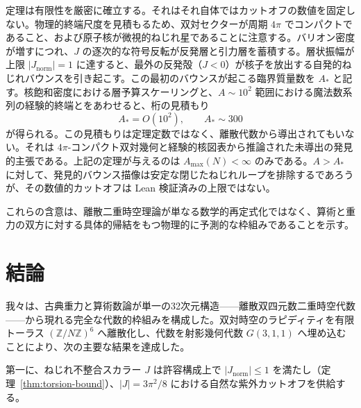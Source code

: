 \documentclass[a4paper]{article}
\theoremstyle{definition}
\theoremstyle{remark}
\newcommand{\Jnorm}{J_{\mathrm{norm}}}
\begin{document}
定理は有限性を厳密に確立する。それはそれ自体ではカットオフの数値を固定しない。物理的終端尺度を見積もるため、双対セクターが周期 \(4\pi\) でコンパクトであること、および原子核が微視的ねじれ星であることに注意する。バリオン密度が増すにつれ、\(J\) の逐次的な符号反転が反発層と引力層を蓄積する。層状振幅が上限 \(|\Jnorm| = 1\) に達すると、最外の反発殻（\(J < 0\)）が核子を放出する自発的ねじれバウンスを引き起こす。この最初のバウンスが起こる臨界質量数を \(A_*\) と記す。核飽和密度における層予算スケーリングと、\(A \sim 10^2\) 範囲における魔法数系列の経験的終端とをあわせると、桁の見積もり
\[
A_* = O(10^2), \qquad A_* \sim 300
\]
が得られる。この見積もりは定理定数ではなく、離散代数から導出されてもいない。それは \(4\pi\)-コンパクト双対幾何と経験的核図表から推論された未導出の発見的主張である。上記の定理が与えるのは \(A_{\max}(N)<\infty\) のみである。\(A > A_*\) に対して、発見的バウンス描像は安定な閉じたねじれループを排除するであろうが、その数値的カットオフは Lean 検証済みの上限ではない。

これらの含意は、離散二重時空理論が単なる数学的再定式化ではなく、算術と重力の双方に対する具体的帰結をもつ物理的に予測的な枠組みであることを示す。

\section{結論}

我々は、古典重力と算術数論が単一の32次元構造——離散双四元数二重時空代数——から現れる完全な代数的枠組みを構成した。双対時空のラピディティを有限トーラス \( (\mathbb{Z}/N\mathbb{Z})^6 \) へ離散化し、代数を射影幾何代数 \( G(3,1,1) \) へ埋め込むことにより、次の主要な結果を達成した。

第一に、ねじれ不整合スカラー \( J \) は許容構成上で \(|\Jnorm| \leq 1\) を満たし（定理~\ref{thm:torsion-bound}）、\(|J| = 3\pi^2/8\) における自然な紫外カットオフを供給する。
\end{document}
